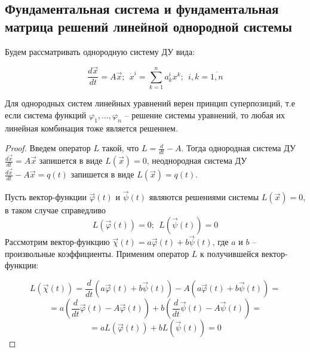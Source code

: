 \subsection{Фундаментальная система и фундаментальная матрица решений линейной однородной
системы}

Будем рассматривать однородную систему ДУ вида:

\begin{equation}
    \frac{d \vec x}{dt} = A \vec x; ~~ \dot x^i = \sum^n_{k = 1} a^i_k x^k; ~~ i, k = \overline{1, n} 
\end{equation}

\begin{proposition}
    Для однородных систем линейных уравнений верен принцип суперпозиций, т.е если
    система функций $\varphi_1, \dots, \varphi_n$ -- решение системы уравнений, то любая их линейная комбинация тоже
    является решением.
\end{proposition}
\begin{proof}
    Введем оператор $L$ такой, что $L = \frac{d}{dt} - A$. Тогда однородная система ДУ $\frac{d \vec x}{dt} = A \vec x$ запишется в виде
    $L(\vec x) = 0$, неоднородная система ДУ $\frac{d \vec x}{dt} - A \vec x = q(t)$ запишется в виде $L(\vec x) = q(t)$.
    
    Пусть вектор-функции $\vec{\varphi}(t)$ и $\vec{\psi}(t)$ являются решениями системы $L(\vec x) = 0$, в таком случае справедливо
    \[ L(\vec{\varphi}(t)) = 0; ~~ L(\vec{\psi}(t)) = 0 \]
    Рассмотрим вектор-функцию $\vec{\chi}(t) = a \vec{\varphi}(t) + b \vec{\psi}(t)$, где $a$ и $b$ --  произвольные коэффициенты. Применим оператор $L$ к получившейся вектор-функции:
    
    \[ L(\vec{\chi}(t)) = \frac{d}{dt} \left(a \vec{\varphi}(t) + b \vec{\psi}(t) \right) - A \left(a \vec{\varphi}(t) + b \vec{\psi}(t) \right) = \]
    \[ = a \left(\frac{d}{dt} \vec{\varphi}(t) - A \vec{\varphi}(t) \right) + b \left(\frac{d}{dt} \vec{\psi}(t) - A \vec{\psi}(t) \right) = \]
    \[ = a L(\vec{\varphi}(t)) + b L(\vec{\psi}(t)) = 0 \]
    
\end{proof}

